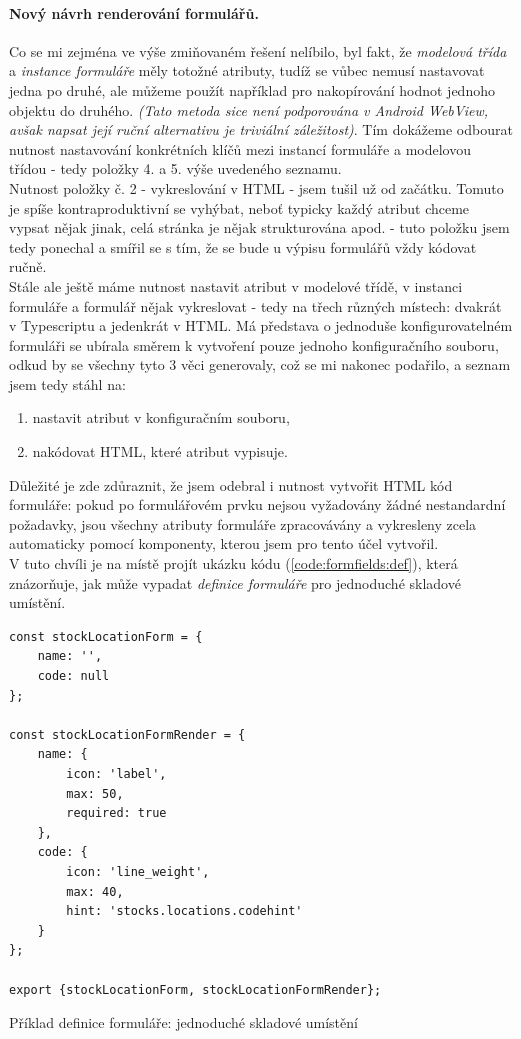 \paragraph{Nový návrh renderování formulářů.} Co se mi zejména ve výše zmiňovaném řešení nelíbilo, byl fakt, že \emph{modelová třída} a \emph{instance formuláře} měly totožné atributy, tudíž se vůbec nemusí nastavovat jedna po druhé, ale můžeme použít například  \cite{mdn-object-assign} pro nakopírování hodnot jednoho objektu do druhého. \emph{(Tato metoda sice není podporována v Android WebView, avšak napsat její ruční alternativu je triviální záležitost)}. Tím dokážeme odbourat nutnost nastavování konkrétních klíčů mezi instancí formuláře a modelovou třídou - tedy položky 4. a 5. výše uvedeného seznamu.\\
Nutnost položky č. 2 - vykreslování v HTML - jsem tušil už od začátku. Tomuto je spíše kontraproduktivní se vyhýbat, neboť typicky každý atribut chceme vypsat nějak jinak, celá stránka je nějak strukturována apod. - tuto položku jsem tedy ponechal a smířil se s tím, že se bude u výpisu formulářů vždy kódovat ručně.\\
Stále ale ještě máme nutnost nastavit atribut v modelové třídě, v instanci formuláře a formulář nějak vykreslovat - tedy na třech různých místech: dvakrát v Typescriptu a jedenkrát v HTML. Má představa o jednoduše konfigurovatelném formuláři se ubírala směrem k vytvoření pouze jednoho konfiguračního souboru, odkud by se všechny tyto 3 věci generovaly, což se mi nakonec podařilo, a seznam jsem tedy stáhl na:

\begin{enumerate}
    \item nastavit atribut v konfiguračním souboru,
    \item nakódovat HTML, které atribut vypisuje.
\end{enumerate}

Důležité je zde zdůraznit, že jsem odebral i nutnost vytvořit HTML kód formuláře: pokud po formulářovém prvku nejsou vyžadovány žádné nestandardní požadavky, jsou všechny atributy formuláře zpracovávány a vykresleny zcela automaticky pomocí komponenty, kterou jsem pro tento účel vytvořil.\\
V tuto chvíli je na místě projít ukázku kódu (\ref{code:formfields:def}), která znázorňuje, jak může vypadat \emph{definice formuláře} pro jednoduché skladové umístění.

\begin{listing}[h]
\begin{verbatim}
const stockLocationForm = {
    name: '',
    code: null
};

const stockLocationFormRender = {
    name: {
        icon: 'label',
        max: 50,
        required: true
    },
    code: {
        icon: 'line_weight',
        max: 40,
        hint: 'stocks.locations.codehint'
    }
};

export {stockLocationForm, stockLocationFormRender};
\end{verbatim}
\caption{Příklad definice formuláře: jednoduché skladové umístění} \label{code:formfields:def}
\end{listing}


